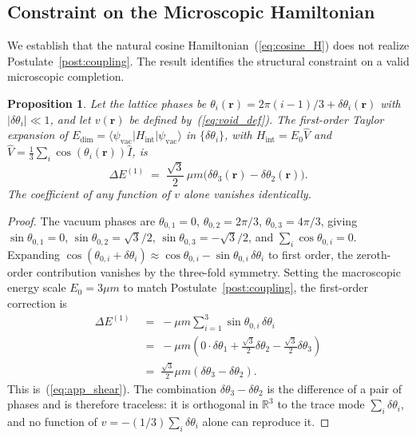 \documentclass[pdflatex,sn-mathphys-num]{sn-jnl}%
\theoremstyle{thmstyleone}%
\newtheorem{proposition}[theorem]{Proposition}
\theoremstyle{thmstyletwo}%
\theoremstyle{thmstylethree}%
\begin{document}
\begin{appendices}
\section{Constraint on the Microscopic Hamiltonian}
\label{app:nogo}

We establish that the natural cosine
Hamiltonian~(\ref{eq:cosine_H}) does not realize
Postulate~\ref{post:coupling}. The result identifies the
structural constraint on a valid microscopic completion.

\begin{proposition}
\label{prop:nogo}
Let the lattice phases be
$\theta_i(\mathbf{r})=2\pi(i-1)/3+\delta\theta_i(\mathbf{r})$
with $|\delta\theta_i|\ll 1$, and let $v(\mathbf{r})$ be
defined by~(\ref{eq:void_def}). The first-order Taylor
expansion of
$E_{\mathrm{dim}}=\langle\psi_{\mathrm{vac}}|H_{\mathrm{int}}
|\psi_{\mathrm{vac}}\rangle$ in $\{\delta\theta_i\}$, with
$H_{\mathrm{int}}=E_0\hat{V}$ and
$\hat{V}=\frac{1}{3}\sum_i\cos(\theta_i(\mathbf{r}))\hat{I}$,
is
\begin{equation}
    \Delta E^{(1)}
    \;=\;
    \frac{\sqrt{3}}{2}\,\mu m
    \bigl(\delta\theta_3(\mathbf{r})
    -\delta\theta_2(\mathbf{r})\bigr).
    \label{eq:app_shear}
\end{equation}
The coefficient of any function of $v$ alone vanishes
identically.
\end{proposition}

\begin{proof}
The vacuum phases are
$\theta_{0,1}=0$, $\theta_{0,2}=2\pi/3$, $\theta_{0,3}=4\pi/3$,
giving $\sin\theta_{0,1}=0$, $\sin\theta_{0,2}=\sqrt{3}/2$,
$\sin\theta_{0,3}=-\sqrt{3}/2$, and
$\sum_i\cos\theta_{0,i}=0$. Expanding 
$\cos(\theta_{0,i}+\delta\theta_i)\approx\cos\theta_{0,i}-\sin\theta_{0,i}\,\delta\theta_i$ 
to first order, the zeroth-order contribution vanishes by the three-fold symmetry. 
Setting the macroscopic energy scale $E_0 = 3\mu m$ to match Postulate~\ref{post:coupling}, 
the first-order correction is
\begin{equation}
\begin{split}
    \Delta E^{(1)}
    &\;=\;
    -\mu m\sum_{i=1}^{3}\sin\theta_{0,i}\,\delta\theta_i \\
    &\;=\;
    -\mu m\!\left(0\cdot\delta\theta_1+\tfrac{\sqrt{3}}{2}
    \delta\theta_2-\tfrac{\sqrt{3}}{2}\delta\theta_3\right) \\
    &\;=\;
    \tfrac{\sqrt{3}}{2}\mu m(\delta\theta_3-\delta\theta_2).
\end{split}
\end{equation}
This is~(\ref{eq:app_shear}). The combination
$\delta\theta_3-\delta\theta_2$ is the difference of a pair of
phases and is therefore traceless: it is orthogonal in
$\mathbb{R}^3$ to the trace mode $\sum_i\delta\theta_i$,
and no function of $v=-(1/3)\sum_i\delta\theta_i$ alone can
reproduce it.
\end{proof}


\end{appendices}
\end{document}
